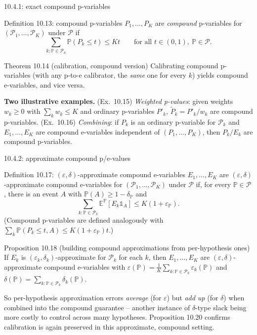 \documentclass[aspectratio=169,10pt]{beamer}
\newcommand{\E}{\mathbb{E}}
\newcommand{\Pb}{\mathbb{P}}
\newcommand{\calP}{\mathcal{P}}
\begin{document}
\begin{frame}{10.4.1: exact compound p-variables}
  \begin{block}{Definition 10.13: compound p-variables}
    $P_1,\dots,P_K$ are \emph{compound} p-variables for $(\calP_1,\dots,\calP_K)$ under $\calP$ if
    \[
      \sum_{k:\Pb\in\calP_k} \Pb(P_k\leq t) \leq Kt \qquad \text{for all } t\in(0,1),\ \Pb\in\calP.
    \]
  \end{block}
  \begin{block}{Theorem 10.14 (calibration, compound version)}
    Calibrating compound p-variables (with any p-to-e calibrator, the \emph{same} one for every $k$) yields compound e-variables, and vice versa.
  \end{block}
  \textbf{Two illustrative examples.} (Ex.\ 10.15) \emph{Weighted p-values}: given weights $w_k\geq0$ with $\sum_k w_k\leq K$ and ordinary p-variables $P'_k$, $\tilde P_k = P'_k/w_k$ are compound p-variables. (Ex.\ 10.16) \emph{Combining}: if $P_k$ is an ordinary p-variable for $\calP_k$ and $E_1,\dots,E_K$ are compound e-variables independent of $(P_1,\dots,P_K)$, then $P_k/E_k$ are compound p-variables.
\end{frame}

\begin{frame}{10.4.2: approximate compound p/e-values}
  \begin{block}{Definition 10.17: $(\varepsilon,\delta)$-approximate compound e-variables}
    $E_1,\dots,E_K$ are $(\varepsilon,\delta)$-approximate compound e-variables for $(\calP_1,\dots,\calP_K)$ under $\calP$ if, for every $\Pb\in\calP$, there is an event $A$ with $\Pb(A)\geq1-\delta_\Pb$ and
    \[
      \sum_{k:\Pb\in\calP_k} \E^{\Pb}[E_k\mathbb{1}_A] \leq K(1+\varepsilon_\Pb).
    \]
    (Compound p-variables are defined analogously with $\sum_k \Pb(P_k\leq t,A)\leq K(1+\varepsilon_\Pb)t$.)
  \end{block}
  \begin{block}{Proposition 10.18 (building compound approximations from per-hypothesis ones)}
    If $E_k$ is $(\varepsilon_k,\delta_k)$-approximate for $\calP_k$ for each $k$, then $E_1,\dots,E_K$ are $(\varepsilon,\delta)$-approximate compound e-variables with $\varepsilon(\Pb)=\frac1K\sum_{k:\Pb\in\calP_k}\varepsilon_k(\Pb)$ and $\delta(\Pb)=\sum_{k:\Pb\in\calP_k}\delta_k(\Pb)$.
  \end{block}
  So per-hypothesis approximation errors \emph{average} (for $\varepsilon$) but \emph{add up} (for $\delta$) when combined into the compound guarantee -- another instance of $\delta$-type slack being more costly to control across many hypotheses. Proposition 10.20 confirms calibration is again preserved in this approximate, compound setting.
\end{frame}
\end{document}
